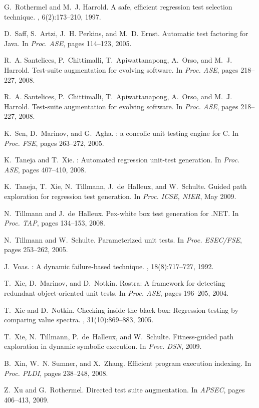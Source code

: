 \documentclass{llncs}
\begin{document}
\begin{thebibliography}{10}
\begin{scriptsize}
G.~Rothermel and M.~J. Harrold.
\newblock A safe, efficient regression test selection technique.
, 6(2):173--210, 1997.

D.~Saff, S.~Artzi, J.~H. Perkins, and M.~D. Ernst.
\newblock Automatic test factoring for {Java}.
\newblock In {\em Proc. ASE}, pages 114--123, 2005.

R.~A. Santelices, P.~Chittimalli, T.~Apiwattanapong, A.~Orso, and M.~J.
  Harrold.
\newblock Test-suite augmentation for evolving software.
\newblock In {\em Proc. ASE}, pages 218--227, 2008.

R.~A. Santelices, P.~Chittimalli, T.~Apiwattanapong, A.~Orso, and M.~J.
  Harrold.
\newblock Test-suite augmentation for evolving software.
\newblock In {\em Proc. ASE}, pages 218--227, 2008.

K.~Sen, D.~Marinov, and G.~Agha.
: a concolic unit testing engine for {C}.
\newblock In {\em Proc. FSE}, pages 263--272, 2005.

K.~Taneja and T.~Xie.
: Automated regression unit-test generation.
\newblock In {\em Proc. ASE}, pages 407--410, 2008.

K.~Taneja, T.~Xie, N.~Tillmann, J.~de~Halleux, and W.~Schulte.
\newblock Guided path exploration for regression test generation.
\newblock In {\em Proc. ICSE, NIER}, May 2009.

N.~Tillmann and J.~de~Halleux.
\newblock Pex-white box test generation for {.{N}{E}{T}}.
\newblock In {\em Proc. TAP}, pages 134--153, 2008.

N.~Tillmann and W.~Schulte.
\newblock Parameterized unit tests.
\newblock In {\em Proc. ESEC/FSE}, pages 253--262, 2005.

J.~Voas.
: A dynamic failure-based technique.
, 18(8):717--727, 1992.

T.~Xie, D.~Marinov, and D.~Notkin.
\newblock Rostra: A framework for detecting redundant object-oriented unit
  tests.
\newblock In {\em Proc. ASE}, pages 196--205, 2004.

T.~Xie and D.~Notkin.
\newblock Checking inside the black box: Regression testing by comparing value
  spectra.
, 31(10):869--883, 2005.

T.~Xie, N.~Tillmann, P.~de~Halleux, and W.~Schulte.
\newblock Fitness-guided path exploration in dynamic symbolic execution.
\newblock In {\em Proc. DSN}, 2009.

B.~Xin, W.~N. Sumner, and X.~Zhang.
\newblock Efficient program execution indexing.
\newblock In {\em Proc. PLDI}, pages 238--248, 2008.

Z.~Xu and G.~Rothermel.
\newblock Directed test suite augmentation.
\newblock In {\em APSEC}, pages 406--413, 2009.

\end{scriptsize}
\end{thebibliography}
\end{document}
